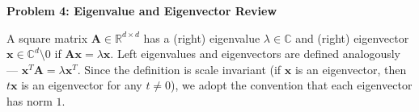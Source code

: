 \documentclass{article}\usepackage[utf8]{inputenc}\usepackage[margin=0.4cm,top=0.4cm,bottom=0.4cm]{geometry}\usepackage[usenames,dvipsnames,svgnames,table]{xcolor}
\begin{document}
\vspace{-2mm}\noindent\begin{mybox}{\begin{center}\textbf{\color{black}Problem 4: Eigenvalue and Eigenvector Review}\end{center}}\end{mybox}\vspace{-2mm}
\vspace{10pt}
\noindent A square matrix $\mathbf{A} \in \mathbb{R}^{d \times d}$ has a (right) eigenvalue $\lambda \in \mathbb{C}$ and (right) eigenvector $\mathbf{x} \in \mathbb{C}^{d} \setminus 0$ if $\mathbf{A}\mathbf{x} = \lambda \mathbf{x}$. Left eigenvalues and eigenvectors are defined analogously --- $\mathbf{x}^T \mathbf{A} = \lambda \mathbf{x}^T$. Since the definition is scale invariant (if $\mathbf{x}$ is an eigenvector, then $t\mathbf{x}$ is an eigenvector for any $t \neq 0$), we adopt the convention that each eigenvector has norm $1$.
\end{document}
